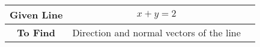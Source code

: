 \begin{tabular}[12pt]{|c|c|c|}
    \hline
    \textbf{Given Line} & $x+y=2$ \\ 
        \hline
    \textbf{To Find} & Direction and normal vectors of the line \\
    	\hline
\end{tabular}
